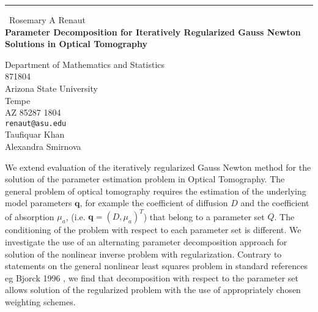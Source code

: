 \documentclass{report}
\begin{document}
\begin{center}
\rule{6in}{1pt} \
{\large Rosemary A Renaut \\
{\bf Parameter Decomposition for Iteratively Regularized Gauss Newton Solutions in Optical Tomography}}

Department of Mathematics and Statistics \\ 871804 \\ Arizona State University \\ Tempe \\ AZ 85287 1804
\\
{\tt renaut@asu.edu}\\
Taufiquar Khan\\
Alexandra Smirnova\end{center}


We extend evaluation of the iteratively regularized Gauss Newton method
for the solution of the parameter estimation problem in Optical
Tomography. The general problem of optical tomography requires the
estimation of the underlying model parameters ${\mathbf q}$, for example
the coefficient of diffusion $D$ and the coefficient of absorption
$\mu_a$, (i.e. ${\mathbf q}=(D,\mu_a)^T$) that belong to a parameter set
$Q$. The conditioning of the problem with respect to each parameter set
is different. We investigate the use of an alternating parameter
decomposition approach for solution of the nonlinear inverse problem with
regularization. Contrary to statements on the general nonlinear least
squares problem in standard references eg Bjorck 1996 , we find that
decomposition with respect to the parameter set allows solution of the
regularized problem with the use of appropriately chosen weighting
schemes.
\end{document}
